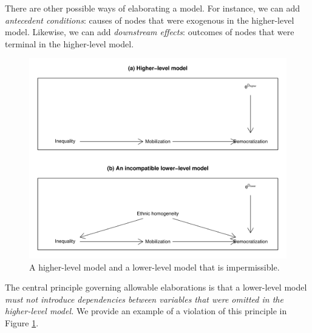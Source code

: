 \documentclass[12pt,]{book}
\begin{document}
There are other possible ways of elaborating a model. For instance, we can add \emph{antecedent conditions}: causes of nodes that were exogenous in the higher-level model. Likewise, we can add \emph{downstream effects}: outcomes of nodes that were terminal in the higher-level model.

\begin{figure}

{\centering \includegraphics[width=.7\textwidth]{ii_files/figure-latex/incompat-1} 

}

\caption{A higher-level model and a lower-level model that is impermissible.}\label{fig:incompat}
\end{figure}

The central principle governing allowable elaborations is that a lower-level model \emph{must not introduce dependencies between variables that were omitted in the higher-level model.} We provide an example of a violation of this principle in Figure \ref{fig:incompat}.
\end{document}
